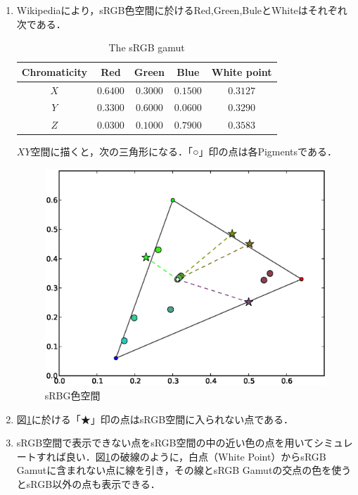\documentclass[a4paper,11pt]{jsarticle}
\numberwithin{theorem}{section}  %
\numberwithin{equation}{section} %
\begin{document}
\begin{enumerate}
\begin{table}[H]
\end{table}

\item Wikipediaにより，sRGB色空間に於けるRed,Green,BuleとWhiteはそれぞれ次である．
\begin{table}[H]
\caption{The sRGB gamut}
\begin{center}
\begin{tabular}{|c|c|c|c|c|}
\hline
Chromaticity & Red & Green & Blue & White point \\
\hline
$X$& 	$0.6400$& 	$0.3000$& 	$0.1500$& 	$0.3127$\\
$Y$& 	$0.3300$& 	$0.6000$& 	$0.0600$& 	$0.3290$\\
$Z$& 	$0.0300$& 	$0.1000$& 	$0.7900$& 	$0.3583$\\
\hline
\end{tabular}
\end{center}
\label{default}
\end{table}
$XY$空間に描くと，次の三角形になる．「○」印の点は各Pigmentsである．
\begin{figure}[H]
\includegraphics[width=14.5cm]{chrome.ps}
\caption{sRBG色空間}
\label{CHROME}
\end{figure}
\item 図\ref{CHROME}に於ける「★」印の点はsRGB空間に入られない点である．
\item sRGB空間で表示できない点をsRGB空間の中の近い色の点を用いてシミュレートすれば良い．図\ref{CHROME}の破線のように，白点（White Point）からsRGB Gamutに含まれない点に線を引き，その線とsRGB Gamutの交点の色を使うとsRGB以外の点も表示できる．
\end{enumerate}
\end{document}

